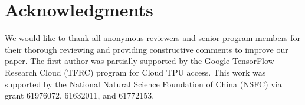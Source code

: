 \documentclass[letterpaper]{article} %
\begin{document}
\section{Acknowledgments}\label{ack}
We would like to thank all anonymous reviewers and senior program members for their thorough reviewing and providing constructive comments to improve our paper. 
The first author was partially supported by the Google TensorFlow Research Cloud (TFRC) program for Cloud TPU access.
This work was supported by the National Natural Science Foundation of China (NSFC) via grant 61976072, 61632011, and 61772153.

\fontsize{9.5pt}{10.5pt} \selectfont 


\end{document}
